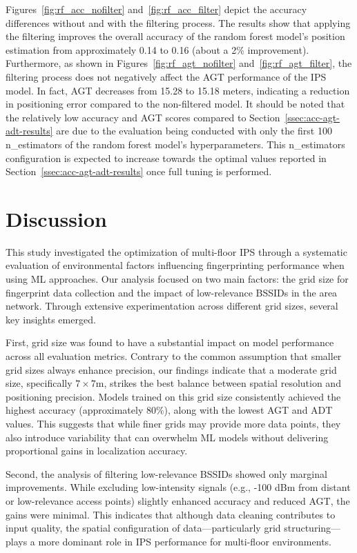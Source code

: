\documentclass[runningheads]{llncs}
\begin{document}
Figures~\ref{fig:rf_acc_nofilter} and~\ref{fig:rf_acc_filter} depict the accuracy differences without and with the filtering process. The results show that applying the filtering improves the overall accuracy of the random forest model's position estimation from approximately 0.14 to 0.16 (about a 2\% improvement). Furthermore, as shown in Figures~\ref{fig:rf_agt_nofilter} and~\ref{fig:rf_agt_filter}, the filtering process does not negatively affect the AGT performance of the IPS model. In fact, AGT decreases from 15.28 to 15.18 meters, indicating a reduction in positioning error compared to the non-filtered model. It should be noted that the relatively low accuracy and AGT scores compared to Section~\ref{ssec:acc-agt-adt-results} are due to the evaluation being conducted with only the first 100 n\_estimators of the random forest model's hyperparameters. This n\_estimators configuration is expected to increase towards the optimal values reported in Section~\ref{ssec:acc-agt-adt-results} once full tuning is performed.

\section{Discussion}\label{sec:discussion}

This study investigated the optimization of multi-floor IPS through a systematic evaluation of environmental factors influencing fingerprinting performance when using ML approaches. Our analysis focused on two main factors: the grid size for fingerprint data collection and the impact of low-relevance BSSIDs in the area network. Through extensive experimentation across different grid sizes, several key insights emerged.

First, grid size was found to have a substantial impact on model performance across all evaluation metrics. Contrary to the common assumption that smaller grid sizes always enhance precision, our findings indicate that a moderate grid size, specifically $7\times7$m, strikes the best balance between spatial resolution and positioning precision. Models trained on this grid size consistently achieved the highest accuracy (approximately 80\%), along with the lowest AGT and ADT values. This suggests that while finer grids may provide more data points, they also introduce variability that can overwhelm ML models without delivering proportional gains in localization accuracy.

Second, the analysis of filtering low-relevance BSSIDs showed only marginal improvements. While excluding low-intensity signals (e.g., -100 dBm from distant or low-relevance access points) slightly enhanced accuracy and reduced AGT, the gains were minimal. This indicates that although data cleaning contributes to input quality, the spatial configuration of data—particularly grid structuring—plays a more dominant role in IPS performance for multi-floor environments.
\end{document}
